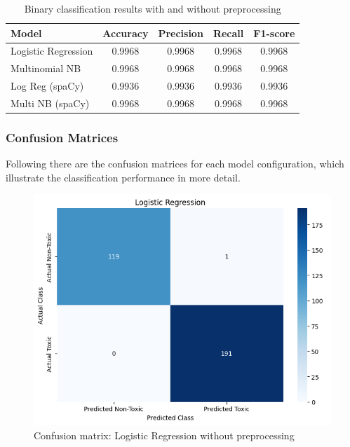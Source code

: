 \documentclass[conference]{IEEEtran}
\begin{document}
\begin{table}[H]
  \centering
  \begin{tabular}{lcccc}
    \toprule
    \textbf{Model} & \textbf{Accuracy} & \textbf{Precision} & \textbf{Recall} & \textbf{F1-score} \\
    \midrule
    Logistic Regression & 0.9968 & 0.9968 & 0.9968 & 0.9968 \\
    Multinomial NB      & 0.9968 & 0.9968 & 0.9968 & 0.9968 \\
    Log Reg (spaCy)     & 0.9936 & 0.9936 & 0.9936 & 0.9936 \\
    Multi NB (spaCy)    & 0.9968 & 0.9968 & 0.9968 & 0.9968 \\
    \bottomrule
  \end{tabular}
  \caption{Binary classification results with and without preprocessing}
  \label{tab:binary_classification_results}
\end{table}

\subsubsection{Confusion Matrices}
\noindent

Following there are the confusion matrices for each model configuration, which illustrate the classification performance in more detail.

\begin{figure}[H]
  \centering
  \includegraphics[width=0.9\columnwidth]{figures/confusion_lr_no_pre.png}
  \caption{Confusion matrix: Logistic Regression without preprocessing}
\end{figure}
\end{document}
